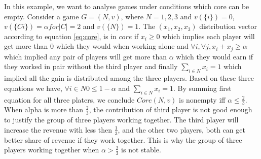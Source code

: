             \begin{example}\label{ex:simplecorealpha}
                In this example, we want to analyse games under conditions which core can be empty. Consider a game $G = (N, v)$,  where $N = {1,2,3}$ and $v(\{i\}) = 0$, $v(\{Ci\}) = \alpha for |C| = 2$ and $v(\{N\}) = 1$. The $(x_1,x_2,x_3)$ distribution vector according to equation \ref{eq:core}, is in $core$ if $x_i \geq 0$ which implies each player will get more than 0 which they would when working alone and $\forall i, \forall j, x_i + x_j \geq \alpha $ which implied any pair of players will get more than $\alpha$ which they would earn if they worked in pair without the third player and finally $\sum_{i \in N} x_i = 1$ which implied all the gain is distributed among the three players. Based on these three equations we have, $\forall i \in N 0 \leqslant 1 - \alpha$ and $\sum_{i \in N} x_i = 1$. By summing first equation for all three platers, we conclude $Core (N,v)$ is nonempty iff $\alpha \leqslant \frac{2}{3}$. When alpha is more than $\frac{2}{3}$, the contribution of third player is not good enough to justify the group of three players working together. The third player will increase the revenue with less then $\frac{1}{3}$, and the other two players, both can get better share of revenue if they work together. This is why the group of three players working together when $\alpha > \frac{2}{3}$ is not stable.
            \end{example}

